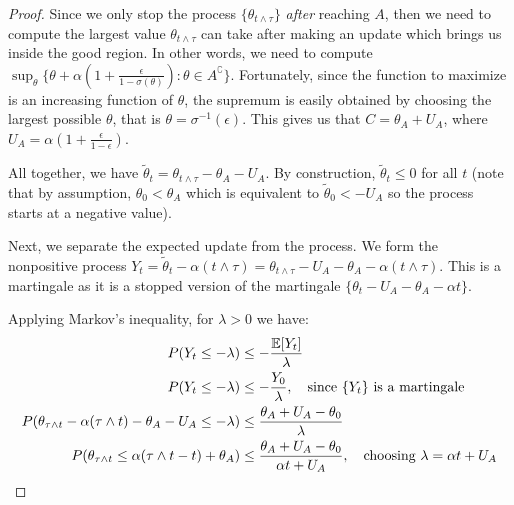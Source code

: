 \begin{proof}
Since we only stop the process $\{ \theta_{t \land \tau} \}$ \textit{after} reaching $A$, then we need to compute the largest value $\theta_{t \land \tau}$ can take after making an update which brings us inside the good region. 
In other words, we need to compute $ \sup_\theta \{\theta + \alpha(1+\frac{\epsilon}{1- \sigma(\theta)}) : \theta \in A^\complement\}$.
Fortunately, since the function to maximize is an increasing function of $\theta$, the supremum is easily obtained by choosing the largest possible $\theta$, that is $\theta = \sigma^{-1}(\epsilon)$. 
This gives us that $C = \theta_A + U_A$, where $U_A = \alpha(1 + \frac{\epsilon}{1-\epsilon})$.

All together, we have $\tilde{\theta}_t = \theta_{t \land \tau} - \theta_A - U_A$.
By construction, $\tilde{\theta}_t \le 0$ for all $t$ (note that by assumption, $\theta_0 < \theta_A$ which is equivalent to $\tilde{\theta}_0 < -U_A$ so the process starts at a negative value). 


Next, we separate the expected update from the process. 
We form the nonpositive process $Y_t = \tilde{\theta}_t - \alpha (t \land \tau) = \theta_{t \land \tau} - U_A - \theta_A - \alpha (t \land \tau)$.
This is a martingale as it is a stopped version of the martingale $\{\theta_{t} - U_A - \theta_A - \alpha t \}$. 

Applying Markov's inequality, for $\lambda > 0$ we have:
\begin{align*}
P(Y_t \le -\lambda) &\le -\frac{\mathbb{E}[Y_t]}{\lambda} \\
P(Y_t \le -\lambda) &\le -\frac{Y_0}{\lambda}, \quad \text{since $\{Y_t\}$ is a martingale} \\
P(\theta_{\tau \land t} - \alpha (\tau \land t) - \theta_A - U_A \le -\lambda) &\le \frac{\theta_A + U_A -\theta_0}{\lambda} \\
P(\theta_{\tau \land t}  \le \alpha (\tau \land t - t) + \theta_A)  &\le \frac{\theta_A + U_A - \theta_0}{\alpha t + U_A}, \quad \text{choosing $\lambda = \alpha t + U_A$}
\end{align*}


\end{proof}
